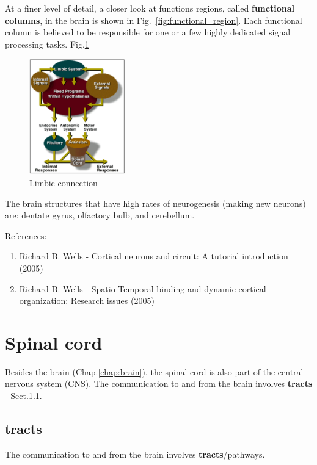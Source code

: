 At a finer level of detail, a closer look at functions regions, called
{\bf functional columns}, in the brain is shown in
Fig.~\ref{fig:functional_region}. Each functional column is believed
to be responsible for one or a few highly dedicated signal processing
tasks. Fig.\ref{fig:limbic_connection}

\begin{figure}[hbt]
  \centerline{\includegraphics[height=5cm,
    angle=0]{./images/limbic_connections.eps}}
\caption{Limbic connection}
\label{fig:limbic_connection}
\end{figure}

The brain structures that have high rates of neurogenesis (making new
neurons) are: dentate gyrus, olfactory bulb, and cerebellum.

References:
\begin{enumerate}
\item Richard B. Wells - Cortical neurons and circuit: A tutorial
  introduction (2005)
\item Richard B. Wells - Spatio-Temporal binding and dynamic cortical
  organization: Research issues (2005)
\end{enumerate}

\chapter{Spinal cord}
\label{chap:spinal-cord}

Besides the brain (Chap.\ref{chap:brain}), the spinal cord is also part of the
central nervous system (CNS). The communication to and from the brain involves
{\bf tracts} - Sect.\ref{sec:tracts}.


\section{tracts}
\label{sec:tracts}

The communication to and from the brain involves {\bf tracts}/pathways.

